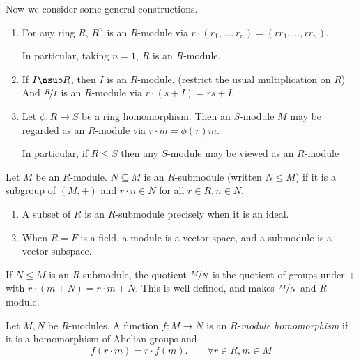 \begin{example}
    Now we consider some general constructions.
    \begin{enumerate}
        \item For any ring \(R\), \(R^n\) is an \(R\)-module via \(r \cdot (r_1, \dots, r_n) = (r r_1, \dots, r r_n)\).

        In particular, taking \(n = 1\), \(R\) is an \(R\)-module.
        \item If \(I \nsub R\), then \(I\) is an \(R\)-module. (restrict the usual multiplication on \(R\)) And \(\nicefrac{R}{I}\) is an \(R\)-module via \(r \cdot(s + I) = rs + I\).
        \item Let \(\phi: R \to S\) be a ring homomorphism. Then an \(S\)-module \(M\) may be regarded as an \(R\)-module via \(r \cdot m = \phi(r)m\).

        In particular, if \(R \leq S\) then any \(S\)-module may be viewed as an \(R\)-module
    \end{enumerate}
\end{example}
\begin{definition}{}{}
    Let \(M\) be an \(R\)-module. \(N \subseteq M\) is an \(R\)-submodule (written \(N \leq M\)) if it is a subgroup of \((M, +)\) and \(r \cdot n \in N\) for all \(r \in R, n \in N\).
\end{definition}
\begin{example}
    \begin{enumerate}
        \item A subset of \(R\) is an \(R\)-submodule precisely when it is an ideal.
        \item When \(R = F\) is a field, a module is a vector space, and a submodule is a vector subspace.
    \end{enumerate}
\end{example}
\begin{definition}{}{}
    If \(N \leq M\) is an \(R\)-submodule, the quotient \(\nicefrac{M}{N}\) is the quotient of groups under \(+\) with \(r \cdot (m + N) = r\cdot m + N\). This is well-defined, and makes \(\nicefrac{M}{N}\) and \(R\)-module.
\end{definition}
\begin{definition}{}{}
    Let \(M,N\) be \(R\)-modules. A function \(f: M \to N\) is an \textit{\(R\)-module homomorphism} if it is a homomorphism of Abelian groups and
    \[
        f(r \cdot m) = r \cdot f(m). \qquad \forall r\in R, m \in M
    \]
\end{definition}
